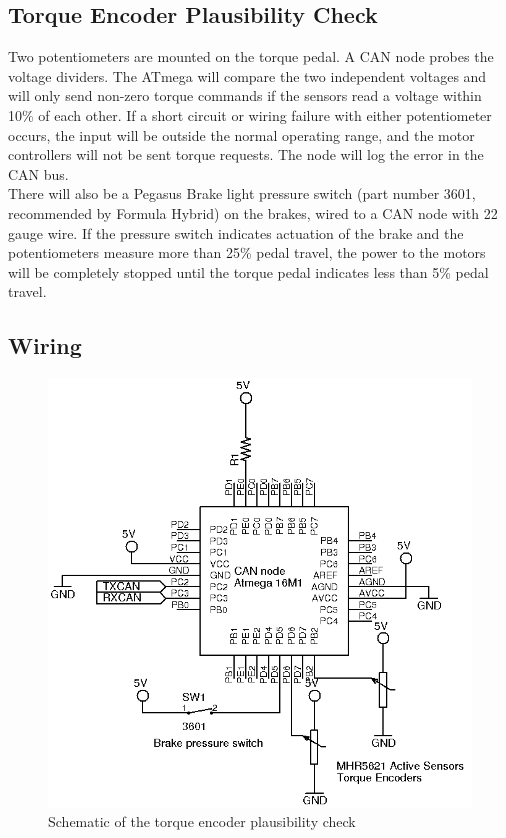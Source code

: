 \documentclass{article}
\begin{document}
    \subsection{Torque Encoder Plausibility Check}


        Two potentiometers are mounted on the torque pedal. A CAN node probes the voltage dividers. The ATmega will compare the two independent voltages and will only send non-zero torque commands if the sensors read a voltage within 10\% of each other. If a short circuit or wiring failure with either potentiometer occurs, the input will be outside the normal operating range, and the motor controllers will not be sent torque requests. The node will log the error in the CAN bus.\\

        There will also be a Pegasus Brake light pressure switch (part number 3601, recommended by Formula Hybrid) on the brakes, wired to a CAN node with 22 gauge wire. If the pressure switch indicates actuation of the brake and the potentiometers measure more than 25\% pedal travel, the power to the motors will be completely stopped until the torque pedal indicates less than 5\% pedal travel.

    \subsection{Wiring}


        \begin{figure}[H]
            \centering
            \includegraphics{torquebrakecheck}
            \caption{Schematic of the torque encoder plausibility check}
            \label{braketorque}
        \end{figure}
\end{document}
